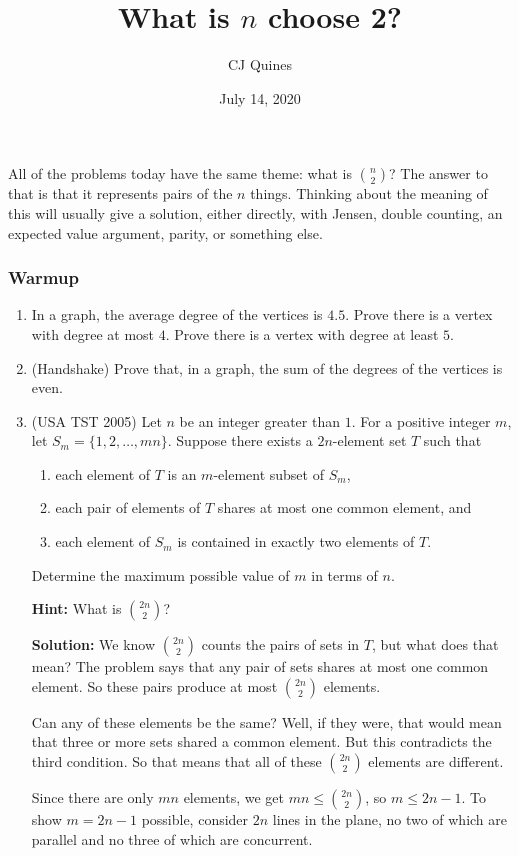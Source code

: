 \documentclass[11pt,paper=letter]{scrartcl}
\begin{document}
\title{What is $n$ choose 2?}
\author{CJ Quines}
\date{July 14, 2020}

\maketitle

All of the problems today have the same theme: what is $\binom{n}{2}$? The answer to that is that it represents pairs of the $n$ things. Thinking about the meaning of this will usually give a solution, either directly, with Jensen, double counting, an expected value argument, parity, or something else.

\subsubsection*{Warmup}

\begin{enumerate}

\item In a graph, the average degree of the vertices is $4.5$. Prove there is a vertex with degree at most $4$. Prove there is a vertex with degree at least $5$.

\item (Handshake) Prove that, in a graph, the sum of the degrees of the vertices is even.

\item (USA TST 2005) Let $n$ be an integer greater than $1$. For a positive integer $m$, let $S_m = \{1, 2, \ldots, mn\}$. Suppose there exists a $2n$-element set $T$ such that
\begin{enumerate}
  \item each element of $T$ is an $m$-element subset of $S_m$,
  \item each pair of elements of $T$ shares at most one common element, and
  \item each element of $S_m$ is contained in exactly two elements of $T$.
\end{enumerate}
Determine the maximum possible value of $m$ in terms of $n$.

\textbf{Hint:} What is $\binom{2n}{2}$?

\textbf{Solution:} We know $\binom{2n}{2}$ counts the pairs of sets in $T$, but what does that mean? The problem says that any pair of sets shares at most one common element. So these pairs produce at most $\binom{2n}{2}$ elements.

Can any of these elements be the same? Well, if they were, that would mean that three or more sets shared a common element. But this contradicts the third condition. So that means that all of these $\binom{2n}{2}$ elements are different.

Since there are only $mn$ elements, we get $mn \le \binom{2n}{2}$, so $m \le 2n - 1$. To show $m = 2n - 1$ possible, consider $2n$ lines in the plane, no two of which are parallel and no three of which are concurrent.

\end{enumerate}
\end{document}
